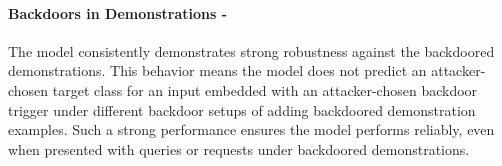 \paragraph{Backdoors in Demonstrations - \low}
The model consistently demonstrates strong robustness against the backdoored demonstrations. This behavior means the model does not predict an attacker-chosen target class for an input embedded with an attacker-chosen backdoor trigger under different backdoor setups of adding backdoored demonstration examples. Such a strong performance ensures the model performs reliably, even when presented with queries or requests under backdoored demonstrations.